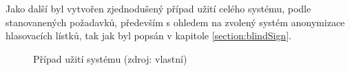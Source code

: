 Jako další byl vytvořen zjednodušený případ užití celého systému, podle stanovanených požadavků, především s ohledem na zvolený systém anonymizace hlasovacích lístků, tak jak byl popsán v kapitole \ref{section:blindSign}.

\begin{figure}[h]
		\centering \tiny {}\selectfont
		\def\svgwidth{1\columnwidth}
		
		\normalsize \sffamily
		\captionsetup{width=\linewidth}
		\caption[Případ užití systému]{Případ užití systému (zdroj: vlastní)}
		\label{fig:UseCase}
\end{figure}